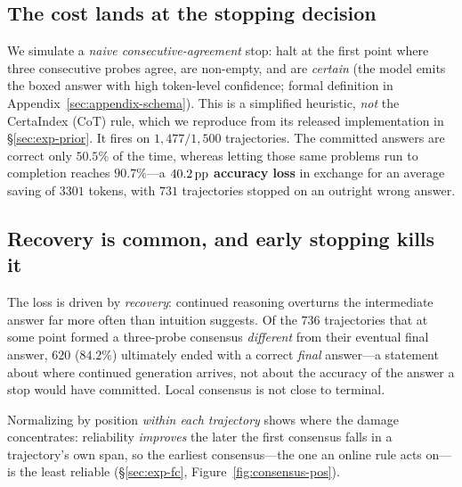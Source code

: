 \subsection{The cost lands at the stopping decision}
We simulate a \emph{naive consecutive-agreement} stop: halt at the first point
where three consecutive probes agree, are non-empty, and are \emph{certain}
(the model emits the boxed answer with high token-level confidence; formal
definition in Appendix~\ref{sec:appendix-schema}). This is a simplified
heuristic, \emph{not} the CertaIndex (CoT) rule, which we reproduce from its
released implementation in
\S\ref{sec:exp-prior}. It fires on $1{,}477/1{,}500$ trajectories. The committed
answers are correct only $50.5\%$ of the time, whereas letting those same
problems run to completion reaches $90.7\%$---a
\textbf{$40.2\,\text{pp}$ accuracy loss} in exchange for an average saving of $3301$
tokens, with $731$ trajectories stopped on an outright wrong answer.

\subsection{Recovery is common, and early stopping kills it}
The loss is driven by \emph{recovery}: continued reasoning overturns the
intermediate answer far more often than intuition suggests. Of the $736$
trajectories that at some point formed a three-probe consensus \emph{different}
from their eventual final answer, $620$ ($84.2\%$) ultimately ended with a
correct \emph{final} answer---a statement about where continued generation
arrives, not about the accuracy of the answer a stop would have committed.
Local consensus is not close to terminal.

Normalizing by position \emph{within each trajectory} shows where the damage
concentrates: reliability \emph{improves} the later the first consensus falls in
a trajectory's own span, so the earliest consensus---the one an online rule acts
on---is the least reliable (\S\ref{sec:exp-fc},
Figure~\ref{fig:consensus-pos}).

